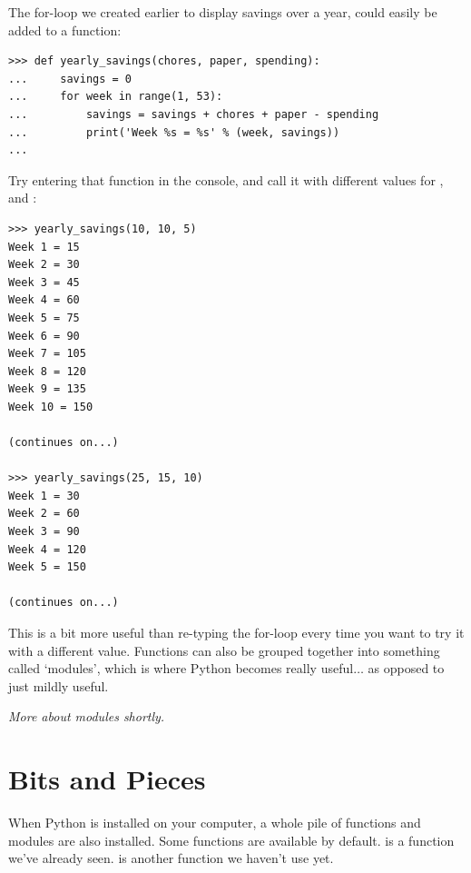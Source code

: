The for-loop we created earlier to display savings over a year, could easily be added to a function:

\begin{listing}
\begin{verbatim}
>>> def yearly_savings(chores, paper, spending):
...     savings = 0
...     for week in range(1, 53):
...         savings = savings + chores + paper - spending
...         print('Week %s = %s' % (week, savings))
...
\end{verbatim}
\end{listing}

Try entering that function in the console, and call it with different values for ,  and :

\begin{listing}
\begin{verbatim}
>>> yearly_savings(10, 10, 5)
Week 1 = 15
Week 2 = 30
Week 3 = 45
Week 4 = 60
Week 5 = 75
Week 6 = 90
Week 7 = 105
Week 8 = 120
Week 9 = 135
Week 10 = 150

(continues on...)

>>> yearly_savings(25, 15, 10)
Week 1 = 30
Week 2 = 60
Week 3 = 90
Week 4 = 120
Week 5 = 150

(continues on...)
\end{verbatim}
\end{listing}

This is a bit more useful than re-typing the for-loop every time you want to try it with a different value. Functions can also be grouped together into something called `modules', which is where Python becomes really useful$\ldots$ as opposed to just mildly useful.
\par
\noindent
\emph{More about modules shortly.}

\section{Bits and Pieces}

When Python is installed on your computer, a whole pile of functions and modules are also installed. Some functions are available by default.   is a function we've already seen.  is another function we haven't use yet.

